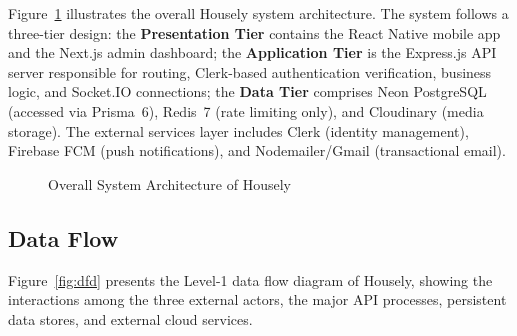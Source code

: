 \documentclass[12pt,a4paper]{report}
\begin{document}
Figure~\ref{fig:arch} illustrates the overall Housely system architecture. The system
follows a three-tier design: the \textbf{Presentation Tier} contains the React Native
mobile app and the Next.js admin dashboard; the \textbf{Application Tier} is the
Express.js API server responsible for routing, Clerk-based authentication verification,
business logic, and Socket.IO connections; the \textbf{Data Tier} comprises Neon
PostgreSQL (accessed via Prisma~6), Redis~7 (rate limiting only), and Cloudinary (media
storage). The external services layer includes Clerk (identity management), Firebase FCM
(push notifications), and Nodemailer/Gmail (transactional email).

\begin{figure}[H]
\centering
{}
\caption{Overall System Architecture of Housely}
\label{fig:arch}
\end{figure}

\subsection{Data Flow}

Figure~\ref{fig:dfd} presents the Level-1 data flow diagram of Housely, showing the
interactions among the three external actors, the major API processes, persistent data
stores, and external cloud services.
\end{document}
